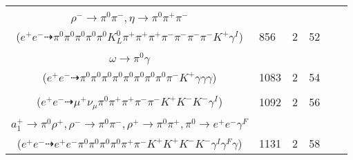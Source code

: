 \documentclass[landscape]{article}
\newcounter{rownumbers}
\newcommand\rn{\stepcounter{rownumbers}\arabic{rownumbers}}
\newcommand{\EOLP}{\\ \hline} %
\newcommand{\topoTags}[1]{#1} %
\begin{document}
\begin{longtable}{clcccc}
\rn & \makecell[l]{ $ 
e^{+} e^{-} \rightarrow \pi^{0} \rho^{-} K^{*+} D^{*+} D_{s}^{-} \gamma^{I} ,
\rho^{-} \rightarrow \pi^{0} \pi^{-} ,
K^{*+} \rightarrow \pi^{0} K^{+} ,
D^{*+} \rightarrow \pi^{+} D^{0} ,
D_{s}^{-} \rightarrow \rho^{-} \eta ,
D^{0} \rightarrow K_{L}^{0} \pi^{+} \pi^{-} ,
$ \\ $
\rho^{-} \rightarrow \pi^{0} \pi^{-} ,
\eta \rightarrow \pi^{0} \pi^{+} \pi^{-} 
$ \\ ($
e^{+} e^{-} \dashrightarrow \pi^{0} \pi^{0} \pi^{0} \pi^{0} \pi^{0} K_{L}^{0} \pi^{+} \pi^{+} \pi^{+} \pi^{-} \pi^{-} \pi^{-} \pi^{-} K^{+} \gamma^{I} 
$) } & \topoTags{856 & }2 & 52 \EOLP

\rn & \makecell[l]{ $ 
e^{+} e^{-} \rightarrow \pi^{0} K^{+} D^{*0} D_{s}^{*-} ,
D^{*0} \rightarrow D^{0} \gamma ,
D_{s}^{*-} \rightarrow D_{s}^{-} \gamma ,
D^{0} \rightarrow \pi^{0} \pi^{0} \pi^{0} K_{S}^{0} ,
D_{s}^{-} \rightarrow \pi^{0} \pi^{-} \omega ,
K_{S}^{0} \rightarrow \pi^{0} \pi^{0} ,
$ \\ $
\omega \rightarrow \pi^{0} \gamma 
$ \\ ($
e^{+} e^{-} \dashrightarrow \pi^{0} \pi^{0} \pi^{0} \pi^{0} \pi^{0} \pi^{0} \pi^{0} \pi^{0} \pi^{-} K^{+} \gamma \gamma \gamma 
$) } & \topoTags{1083 & }2 & 54 \EOLP

\rn & \makecell[l]{ $ 
e^{+} e^{-} \rightarrow \pi^{0} \pi^{+} \pi^{-} D^{0} \bar{D}^{0} \gamma^{I} ,
D^{0} \rightarrow \mu^{+} \nu_{\mu} K^{-} ,
\bar{D}^{0} \rightarrow \pi^{+} \pi^{-} K^{+} K^{-} 
$ \\ ($
e^{+} e^{-} \dashrightarrow \mu^{+} \nu_{\mu} \pi^{0} \pi^{+} \pi^{+} \pi^{-} \pi^{-} K^{+} K^{-} K^{-} \gamma^{I} 
$) } & \topoTags{1092 & }2 & 56 \EOLP

\rn & \makecell[l]{ $ 
e^{+} e^{-} \rightarrow K^{+} K^{-} \bar{D}^{*0} D_{0}^{*0} \gamma^{I} ,
\bar{D}^{*0} \rightarrow \bar{D}^{0} \gamma ,
D_{0}^{*0} \rightarrow \pi^{0} D^{0} ,
\bar{D}^{0} \rightarrow K^{+} a_{1}^{-} ,
D^{0} \rightarrow K^{-} a_{1}^{+} ,
a_{1}^{-} \rightarrow \pi^{0} \rho^{-} ,
$ \\ $
a_{1}^{+} \rightarrow \pi^{0} \rho^{+} ,
\rho^{-} \rightarrow \pi^{0} \pi^{-} ,
\rho^{+} \rightarrow \pi^{0} \pi^{+} ,
\pi^{0} \rightarrow e^{+} e^{-} \gamma^{F} 
$ \\ ($
e^{+} e^{-} \dashrightarrow e^{+} e^{-} \pi^{0} \pi^{0} \pi^{0} \pi^{0} \pi^{+} \pi^{-} K^{+} K^{+} K^{-} K^{-} \gamma^{I} \gamma^{F} \gamma 
$) } & \topoTags{1131 & }2 & 58 \EOLP


\end{longtable}
\end{document}
